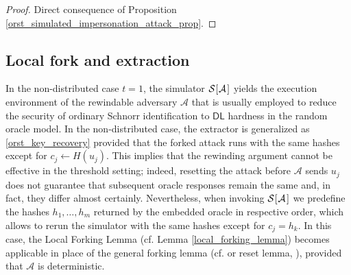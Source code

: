 \documentclass[10pt, psamsfonts, reqno]{amsart}
\theoremstyle{definition}
\theoremstyle{remark}
\numberwithin{equation}{section}
\begin{document}
\begin{proof}
Direct consequence of Proposition
\ref{orst_simulated_impersonation_attack_prop}.
\end{proof}

\subsection{Local fork and extraction}\label{section_extractability}

In the non-distributed case $t=1$,
the simulator
$\mathcal{S}\hspace{0.5pt}[\hspace{0.5pt}\mathcal{A}\hspace{1pt}]$
yields the execution environment of the rewindable adversary
$\mathcal{A}$ that is usually employed to
reduce the security of ordinary Schnorr identification
to $\mathsf{DL}$ hardness in the random oracle model.
In the non-distributed case, the extractor is generalized as
\eqref{orst_key_recovery}
provided that the forked attack runs with the same hashes
except for $c_j \leftarrow H(u_j)$.
This implies that the rewinding argument
cannot be effective in the threshold setting;
indeed, resetting the attack before
$\mathcal{A}$ sends $u_j$ does not
guarantee that subsequent oracle responses remain the same
and, in fact, they differ almost certainly.
Nevertheless, when invoking
$\mathcal{S}\hspace{0.5pt}[\hspace{0.5pt}\mathcal{A}\hspace{1pt}]$
we predefine the hashes $h_1, \dots, h_m$
returned by the embedded oracle in respective order,
which allows to rerun the simulator with the same hashes
except for $c_j = h_k$.
In this case, the Local Forking Lemma
(cf. Lemma \ref{local_forking_lemma})
becomes applicable in place of the general forking lemma
(cf. \cite{paper_bellare_musig}
or reset lemma, \cite{paper_bellare_palacio}),
provided that $\mathcal{A}$
is deterministic.
\end{document}
